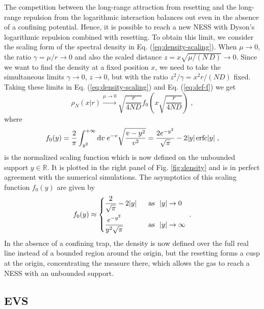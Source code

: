 \documentclass[onecolumn,superscriptaddress,
 amsmath,amssymb,
 aps,
 prd,
]{revtex4-1}
\begin{document}
{\vspace*{0.3cm}
 The competition between the long-range attraction from resetting and the long-range repulsion from the logarithmic interaction balances out even in the absence of a confining potential. Hence, it is possible to reach a new NESS with Dyson's logarithmic repulsion combined with resetting. To obtain this limit, we consider the scaling form of the spectral density in Eq. (\ref{eq:density-scaling}). When $\mu \to 0$, the ratio $\gamma = \mu/r \to 0$ and also the scaled distance $z = x \sqrt{\mu/(N\,D)} \to 0$. Since we want to find the density at a fixed position $x$, we need to take the simultaneous limits $\gamma \to 0$, $z \to 0$, but with the ratio $z^2 / \gamma = x^2 r / (N D)$ fixed. Taking these limits in Eq. (\ref{eq:density-scaling}) and Eq. (\ref{eq:def-f}) we get
\begin{equation} \label{eq:density0}
\rho_N(x | r) \stackrel{\mu \to 0}{\longrightarrow} \sqrt{\frac{r}{4 N D}} f_0 \left( x \sqrt{\frac{r}{4 N D}} \right) \;,
\end{equation}
where 
\begin{equation} \label{eq:def-f0}
f_0(y) = \frac{2}{\pi} \int_{y^2}^{+\infty} \dd v \; e^{-v} \sqrt{\frac{v - y^2}{v^2}} = \frac{2 e^{-y^2}}{\sqrt{\pi}} - 2 |y| \, {\rm erfc} |y| \;,
\end{equation}
is the normalized scaling function which is now defined on the unbounded support $y \in \mathbb{R}$. It is plotted in the right panel of Fig. \ref{fig:density} and is in perfect agreement with the numerical simulations. The asymptotics of this scaling function $f_0(y)$ are given by
\begin{equation} \label{eq:f0-asymptotics}
f_0(y) \approx \begin{dcases}
\frac{2}{\sqrt{\pi}} - 2 |y| &\mbox{~~as~~} |y| \to 0\\
\frac{e^{-y^2}}{y^2 \sqrt{\pi}} &\mbox{~~as~~} |y| \to \infty
\end{dcases} \;.
\end{equation}
In the absence of a confining trap, the density is now defined over the full real line instead of a bounded region around the origin, but the resetting forms a cusp at the origin, concentrating the measure there, which allows the gas to reach a NESS with an unbounded support. 



\subsection{EVS} \label{sec:model-evs}

}
\end{document}
